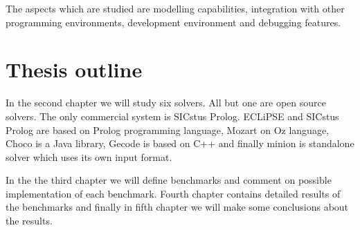 The aspects which are studied are modelling capabilities, integration with other 
programming environments, development environment and debugging features. 

\section{Thesis outline}

In the second chapter we will study six solvers. All but one are open source solvers. 
The only commercial system is SICstus Prolog. ECLiPSE and SICstus Prolog are based on Prolog
programming language, Mozart on Oz language, Choco is a Java library, Gecode is 
based on C++ and finally minion is standalone solver which uses its own input format. 

In the the third chapter we will define benchmarks and comment on possible 
implementation of each benchmark. Fourth chapter contains detailed results of 
the benchmarks and finally in fifth chapter we will make some conclusions about 
the results.
